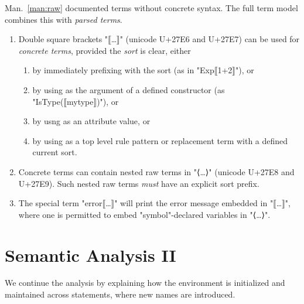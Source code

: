 \documentclass[11pt]{article} %
\begin{document}
\begin{manual}\label{man:parsed}
  Man.~\ref{man:raw} documented terms without concrete syntax. The full term model combines this
  with \emph{parsed terms}.
  \begin{enumerate}

  \item Double square brackets "⟦…⟧" (unicode U+27E6 and U+27E7) can be used for \emph{concrete
      terms}, provided the \emph{sort} is clear, either
    \begin{enumerate}
    \item by immediately prefixing with the sort (as in "Exp⟦1+2⟧"), or
    \item by using as the argument of a defined constructor (as "IsType(⟦mytype⟧)"), or
    \item by usng as an attribute value, or
    \item by using as a top level rule pattern or replacement term with a defined current sort.
    \end{enumerate}

  \item Concrete terms can contain nested raw terms in "⟨…⟩" (unicode U+27E8 and U+27E9). Such
    nested raw terms \emph{must} have an explicit sort prefix.

  \item The special term "error⟦…⟧" will print the error message embedded in "⟦…⟧", where one is
    permitted to embed "symbol"-declared variables in "⟨…⟩".

  \end{enumerate}

\end{manual}


\section{Semantic Analysis II}
\label{sec:analysis2}

We continue the analysis by explaining how the environment is initialized and maintained across
statements, where new names are introduced.
\end{document}
